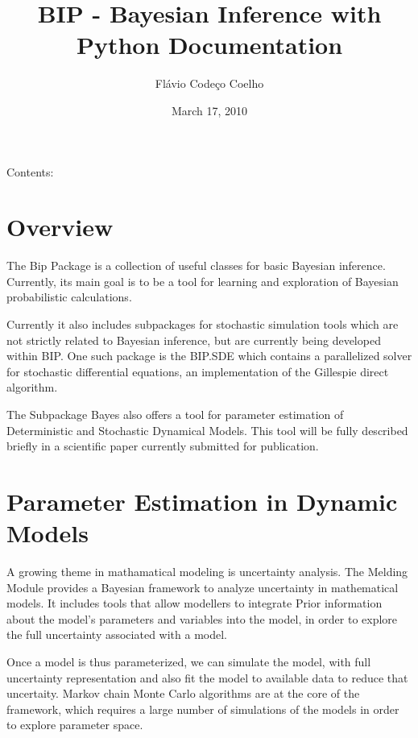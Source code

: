 \documentclass[a4paper,10pt,english]{manual}
\title{BIP - Bayesian Inference with Python Documentation}
\date{March 17, 2010}
\author{Flávio Codeço Coelho}
\begin{document}
\maketitle
\tableofcontents
\hypertarget{--doc-index}{}


Contents:

\resetcurrentobjects
\hypertarget{--doc-overview}{}

\chapter{Overview}

The Bip Package is a collection of useful classes for basic Bayesian inference. Currently, its main goal is to be a tool for learning and exploration of Bayesian probabilistic calculations.

Currently it also includes subpackages for stochastic simulation tools which are not strictly related to Bayesian inference, but are currently being developed within BIP. One such package is the BIP.SDE which contains a parallelized solver for stochastic differential equations, an implementation of the Gillespie direct algorithm.

The Subpackage Bayes also offers a tool for parameter estimation of Deterministic and Stochastic Dynamical Models. This tool will be fully described briefly in a scientific paper currently submitted for publication.

\resetcurrentobjects
\hypertarget{--doc-paramest}{}

\chapter{Parameter Estimation in Dynamic Models}

A growing theme in mathamatical modeling is uncertainty analysis. The Melding Module provides a Bayesian framework to analyze uncertainty in mathematical models. It includes tools that allow modellers to integrate Prior information about the model's parameters and variables into the model, in order to explore the full uncertainty associated with a model.

Once a model is thus parameterized, we can simulate the model, with full uncertainty representation and also fit the model to available data to reduce that uncertaity. Markov chain Monte Carlo algorithms are at the core of the framework, which requires a large number of simulations of the models in order to explore parameter space.
\end{document}

